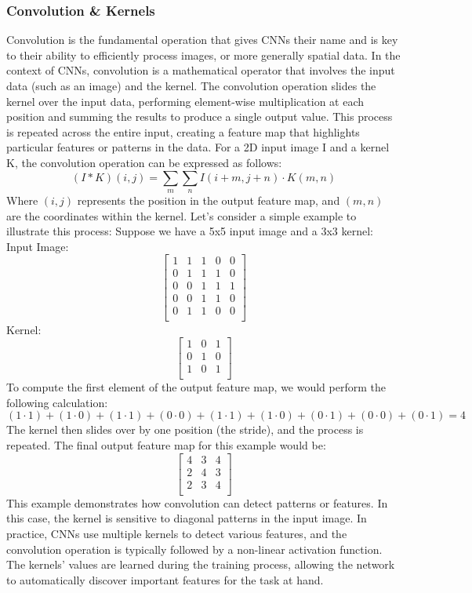 \subsubsection{Convolution \& Kernels}
Convolution is the fundamental operation that gives CNNs their name and is key to their ability to efficiently process images, or more generally spatial data. In the context of CNNs, convolution is a mathematical operator that involves the input data (such as an image) and the kernel.
The convolution operation slides the kernel over the input data, performing element-wise multiplication at each position and summing the results to produce a single output value. This process is repeated across the entire input, creating a feature map that highlights particular features or patterns in the data.
For a 2D input image I and a kernel K, the convolution operation can be expressed as follows:
\[
(I * K)(i, j) = \sum_{m} \sum_{n} I(i+m, j+n) \cdot K(m, n)
\]
Where $(i,j)$ represents the position in the output feature map, and $(m,n)$ are the coordinates within the kernel.
Let's consider a simple example to illustrate this process:
Suppose we have a 5x5 input image and a 3x3 kernel:
Input Image:
\[
\begin{bmatrix}
1 & 1 & 1 & 0 & 0 \\
0 & 1 & 1 & 1 & 0 \\
0 & 0 & 1 & 1 & 1 \\
0 & 0 & 1 & 1 & 0 \\
0 & 1 & 1 & 0 & 0 \\
\end{bmatrix}
\]
Kernel:
\[
\begin{bmatrix}
1 & 0 & 1 \\
0 & 1 & 0 \\
1 & 0 & 1 \\
\end{bmatrix}
\]
To compute the first element of the output feature map, we would perform the following calculation:
\[
(1 \cdot 1) + (1 \cdot 0) + (1 \cdot 1) + (0 \cdot 0) + (1 \cdot 1) + (1 \cdot 0) + (0 \cdot 1) + (0 \cdot 0) + (0 \cdot 1) = 4
\]
The kernel then slides over by one position (the stride), and the process is repeated. The final output feature map for this example would be:
\[
\begin{bmatrix}
4 & 3 & 4 \\
2 & 4 & 3 \\
2 & 3 & 4\\
\end{bmatrix}
\]
This example demonstrates how convolution can detect patterns or features. In this case, the kernel is sensitive to diagonal patterns in the input image.
In practice, CNNs use multiple kernels to detect various features, and the convolution operation is typically followed by a non-linear activation function. The kernels' values are learned during the training process, allowing the network to automatically discover important features for the task at hand.

